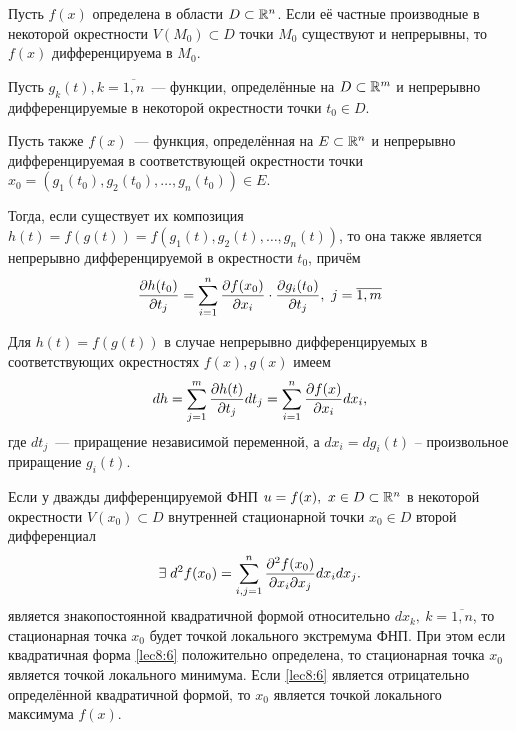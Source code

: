 \documentclass[../main.tex]{subfiles}
\begin{document}
\begin{thm}
Пусть $f(x)$ определена в области $D \subset \mathbb{R}^n$. Если её
частные производные в некоторой окрестности $V(M_0)\subset D$ точки
$M_0$ существуют и непрерывны, то $f(x)$ дифференцируема в $M_0$.
\end{thm}
\begin{thm}
Пусть $g_k(t),k=\overline{1,n}$~--- функции, определённые на 
$D\subset\mathbb{R}^m$ и непрерывно дифференцируемые в некоторой окрестности 
точки $t_0\in D$.

Пусть также $f(x)$~--- функция, определённая на $E\subset\mathbb{R}^n$ и
непрерывно дифференцируемая в соответствующей окрестности точки $x_0 = 
(g_1(t_0),g_2(t_0),\dots,g_n(t_0))\in E$.

Тогда, если существует их композиция $h(t) = f(g(t)) =
f(g_1(t),g_2(t),\dots,g_n(t))$, то она также является непрерывно 
дифференцируемой в окрестности $t_0$, причём
\[\frac{\partial h(t_0)}{\partial t_j}=\sum_{i=1}^{n}
\frac{\partial f(x_0)}{\partial x_i}\cdot
\frac{\partial g_i(t_0)}{\partial t_j},\ j=\overline{1,m}\]
\end{thm}
\begin{crl}
Для $h(t) = f(g(t))$ в случае непрерывно дифференцируемых в 
соответствующих окрестностях $f(x), g(x)$ имеем
\[dh=\sum_{j=1}^m\frac{\partial h(t)}{\partial t_j}dt_j=
\sum_{i=1}^n\frac{\partial f(x)}{\partial x_i}dx_i,\]
где $dt_j$~--- приращение независимой переменной, а $dx_i=dg_i(t)$ --
произвольное приращение $g_i(t)$.
\end{crl}
\begin{thm}
        Если у дважды дифференцируемой ФНП $u=f(x),\ x \in D \subset \mathbb{R}^n$
        в некоторой окрестности $V(x_0) \subset D$ внутренней стационарной
        точки $x_0 \in D$ второй дифференциал \begin{equation}
        \exists \; d^2f(x_0) = \sum_{i, j = 1}^n\frac{\partial ^2f(x_0)}{\partial x_i
        \partial x_j}dx_idx_j.
        \label{lec8:6}
    \end{equation} является
        знакопостоянной квадратичной формой относительно $dx_k,\ k =
        \overline{1, n}$, то стационарная точка $x_0$ будет точкой локального
        экстремума ФНП. При этом если квадратичная форма \eqref{lec8:6}
        положительно определена, то стационарная точка $x_0$ является точкой
        локального минимума. Если \eqref{lec8:6} является отрицательно
        определённой квадратичной формой, то $x_0$ является точкой локального
        максимума $f(x)$.
    \end{thm}
\end{document}

